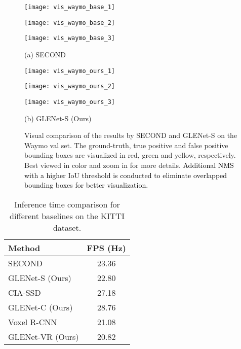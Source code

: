 \documentclass[twocolumn]{svjour3}
\newcommand{\revise}[1]{\textcolor{black}{#1}}
\begin{document}
\begin{figure*}[htp]
	\centering
	\begin{minipage}{0.49\linewidth}
		\vspace{1pt}  
		\centerline{\texttt{[image: vis\_waymo\_base\_1]}}
		\vspace{1pt}
		\centerline{\texttt{[image: vis\_waymo\_base\_2]}}
		\vspace{1pt}
		\centerline{\texttt{[image: vis\_waymo\_base\_3]}}
		\vspace{1pt}
		\centerline{(a) SECOND}
	\end{minipage}
\begin{minipage}{0.49\linewidth}
		\vspace{1pt}
		\centerline{\texttt{[image: vis\_waymo\_ours\_1]}}
		\vspace{1pt}
		\centerline{\texttt{[image: vis\_waymo\_ours\_2]}}
		\vspace{1pt}
		\centerline{\texttt{[image: vis\_waymo\_ours\_3]}}
		\vspace{1pt}
		\centerline{(b) GLENet-S (Ours)}
	\end{minipage}
	\caption{Visual comparison of the results by SECOND and GLENet-S on the Waymo val set. The ground-truth, true positive and false positive bounding boxes are visualized in red, green and yellow, respectively. Best viewed in color and zoom in for more details. \revise{Additional NMS with a higher IoU threshold is conducted to eliminate overlapped bounding boxes for better visualization.}}
	\label{fig:vis_waymo}
\end{figure*}





\setlength{\tabcolsep}{12pt}
\begin{table}
	\centering
	\caption{Inference time comparison for different baselines on the KITTI dataset.}
	\label{inference}
	\begin{tabular}{l|c} 
		\toprule
		Method       & FPS (Hz)  \\ 
		\hline
		SECOND~\cite{yan2018second}      & 23.36     \\
		GLENet-S (Ours)     & 22.80     \\ 
		\hline
		CIA-SSD~\cite{zheng2021cia}     & 27.18    \\
		GLENet-C (Ours)     & 28.76     \\ 
		\hline
		Voxel R-CNN~\cite{deng2021voxel} & 21.08     \\
		GLENet-VR (Ours)    & 20.82    \\
		\bottomrule
	\end{tabular}
\end{table}
\setlength{\tabcolsep}{4pt}
\end{document}
